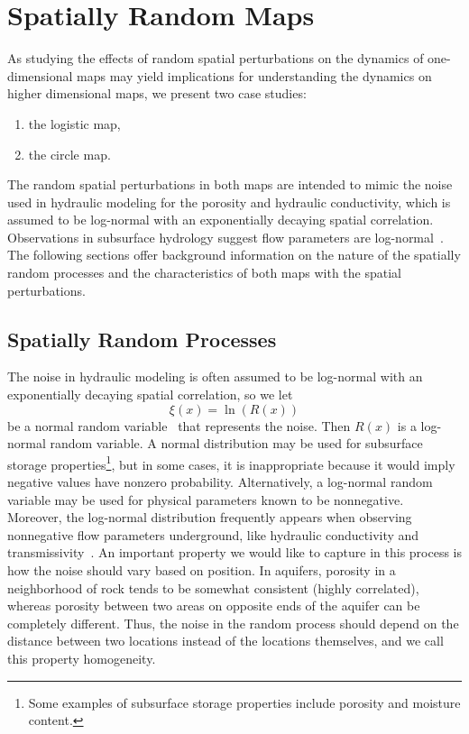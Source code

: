 \chapter{Spatially Random Maps}
As studying the effects of random spatial perturbations
on the dynamics of one-dimensional maps may yield implications for
understanding the dynamics on higher dimensional maps, we present two
case studies:
\begin{enumerate}
\item the logistic map,
\item the circle map.
\end{enumerate}
The random spatial perturbations in both maps are intended to mimic
the noise used in hydraulic modeling for the porosity and hydraulic
conductivity, which is assumed to be log-normal with an
exponentially decaying spatial correlation. Observations
in subsurface hydrology suggest flow parameters are
log-normal~\cite{gelhar}. The following sections offer background
information on the nature of the spatially random processes and the characteristics of both maps with the spatial perturbations. 
\section{Spatially Random Processes}\label{spatprocs}
The noise in hydraulic modeling is often assumed to be log-normal with an
exponentially decaying spatial correlation, so we let
\begin{equation}\label{R}
\xi(x)=\ln(R(x)) 
\end{equation}
be a normal random variable~\cite{gelhar} that represents the noise. Then
$R(x)$ is a log-normal random variable. A normal distribution may be used
for subsurface storage properties\footnote{Some examples of subsurface
storage properties include porosity and moisture content.}, but in some cases, it is
inappropriate because it would imply negative values have nonzero
probability. Alternatively, a log-normal random variable may
be used for physical parameters known to be nonnegative. Moreover, the log-normal distribution frequently appears when observing
nonnegative flow parameters underground, like hydraulic conductivity and
transmissivity~\cite{gelhar}. An important property we would like to
capture in this process is how the noise should vary based on
position. In aquifers, porosity in a neighborhood of rock tends to be
somewhat consistent (highly correlated), whereas porosity between two
areas on opposite ends of the aquifer can be completely
different. Thus, the noise in the random process should depend on the
distance between two locations instead of the locations themselves,
and we call this property homogeneity. 

